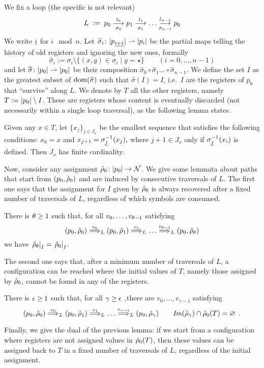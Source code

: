 We fix a loop (the specific \hdma{} is not relevant)
\[
	L \;:=\; p_0 \overset{l_0}{\underset{\sigma_0}{\longrightarrow}} p_1 \overset{l_1}{\underset{\sigma_1}{\longrightarrow}} \dots \overset{l_{n-1}}{\underset{\sigma_{n-1}}{\longrightarrow}} p_0
\]
We write ${\underline{i}}$ for $i \mod n$. Let $\widehat{\sigma}_i \colon |p_{\underline{i+1}}| \rightharpoonup |p_i|$ be the partial maps telling the history of old registers and ignoring the new ones, formally
\[
	\widehat{\sigma}_i := \sigma_i \setminus \{ (x,y) \in \sigma_i \mid y = \star \} 
	\qquad (i=0,\dots,n-1)
\]
and let $\widehat{\sigma} \colon |p_0| \rightharpoonup |p_0|$ be their composition $\widehat{\sigma}_0 \circ \widehat{\sigma}_1 \dots \circ \widehat{\sigma}_{n-1}$. We define the set $I$ as the greatest subset of $\operatorname{dom}(\widehat{\sigma})$ such that $ \widehat{\sigma}(I) = I$,
i.e.\ $I$ are the registers of $p_0$ that ``survive'' along $L$. We denote by $T$ all the other registers, namely $T := |p_0| \setminus I$. These are registers whose content is eventually discarded (not necessarily within a single loop traversal), as the following lemma states.
%
%
\begin{lemma}
\label{lem:rho-forget}
Given any $x \in T$, let $\{x_j\}_{j \in J_x}$ be the smallest sequence that satisfies the following conditions:
$
	x_0 = x
$
and
$
	x_{j+1} = \sigma_{{\underline{j}}}^{-1}(x_j),
$
where $j+1 \in J_x$ only if $\sigma_{{\underline{j}}}^{-1}(x_i)$ is defined. Then $J_x$ has finite cardinality.
\end{lemma}
%
Now, consider any assignment $\hat{\rho}_0 \colon |p_0| \to \mathcal{N}$. We give some lemmata about paths that start from $(p_0,\hat{\rho}_0)$ and are induced by consecutive traversals of $L$. The first one says that the assignment for $I$ given by $\hat{\rho}_0$ is always recovered after a fixed number of traversals of $L$, regardless of which symbols are consumed.
%
\begin{lemma} 
\label{lem:idI}
There is $\theta \geq 1$ such that, for all $v_0,\dots,v_{\theta-1}$ satisfying
\[
	(p_0,\hat{\rho}_0) \overset{v_0}{\Longrightarrow}_{L} (p_0,\hat{\rho}_1) \overset{v_1}{\Longrightarrow}_{L} \dots \overset{v_{\theta-1}}{\Longrightarrow}_{L} (p_0,\hat{\rho}_\theta)
\]
we have $\left. \hat{\rho}_\theta \right|_{I} = \left. \hat{\rho}_0 \right|_{I}$.
\end{lemma}
%
The second one says that, after a minimum number of traversals of $L$, a configuration can be reached where the initial values of $T$, namely those assigned by $\hat{\rho}_0$, cannot be found in any of the registers.
%
\begin{lemma}
There is $\epsilon \geq 1$ such that, for all $\gamma \geq \epsilon$ ,there are $v_0,\dots,v_{\gamma-1}$ satisfying
\[
	(p_0,\hat{\rho}_0) \overset{v_0}{\Longrightarrow}_{L} (p_0,\hat{\rho}_1) \overset{v_1}{\Longrightarrow}_{L} \dots \overset{v_{\gamma-1}}{\Longrightarrow}_{L} (p_0,\hat{\rho}_\gamma)
	\qquad 
	\mathit{Im}(\hat{\rho}_\gamma) \cap \hat{\rho}_0(T) = \varnothing \enspace .
\]
\label{lem:forgetT}
\end{lemma}
%
%
Finally, we give the dual of the previous lemma: if we start from a configuration where registers are not assigned values in $\hat{\rho}_0(T)$, then these values can be assigned back to $T$ in a fixed number of traversals of $L$, regardless of the initial assignment.

